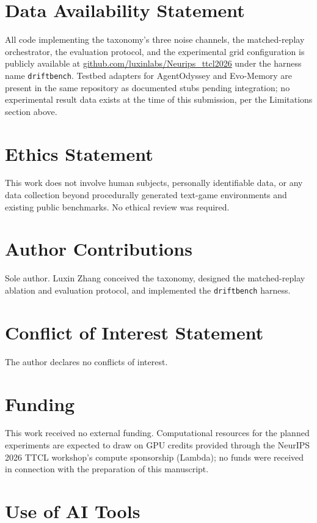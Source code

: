 \documentclass{article}
\begin{document}
\section*{Data Availability Statement}

All code implementing the taxonomy's three noise channels, the matched-replay orchestrator, the evaluation protocol, and the experimental grid configuration is publicly available at \url{github.com/luxinlabs/Neurips_ttcl2026} under the harness name \texttt{driftbench}. Testbed adapters for AgentOdyssey and Evo-Memory are present in the same repository as documented stubs pending integration; no experimental result data exists at the time of this submission, per the Limitations section above.

\section*{Ethics Statement}

This work does not involve human subjects, personally identifiable data, or any data collection beyond procedurally generated text-game environments and existing public benchmarks. No ethical review was required.

\section*{Author Contributions}

Sole author. Luxin Zhang conceived the taxonomy, designed the matched-replay ablation and evaluation protocol, and implemented the \texttt{driftbench} harness.

\section*{Conflict of Interest Statement}

The author declares no conflicts of interest.

\section*{Funding}

This work received no external funding. Computational resources for the planned experiments are expected to draw on GPU credits provided through the NeurIPS 2026 TTCL workshop's compute sponsorship (Lambda); no funds were received in connection with the preparation of this manuscript.

\section*{Use of AI Tools}
\end{document}
